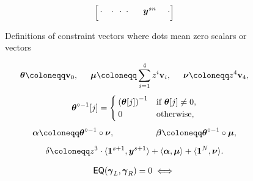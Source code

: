\begin{figure}[h!]
\begin{align*}
\begin{bmatrix}
          \hspace{0.6mm} \cdot & 
          \hspace{0.1mm} \cdot & 
          \hspace{-1mm} \cdot & 
          \hspace{-1.8mm} \cdot &
          \hspace{2.6mm} {\boldsymbol{y}}^{sn} & 
          \hspace{1.2mm} \cdot \\[3pt]
      \end{bmatrix}
  \end{align*}
  \caption{Definitions of constraint vectors where dots mean zero scalars or vectors}
  \label{fig:conVec1}
\end{figure}

\begin{flushleft}
  \begin{minipage}{.48\textwidth}
    \centering
      \begin{gather*}
        \vecnb{\theta} \coloneqq \textbf{v}_{0}, \hspace{0.5cm}
        \vecnb{\mu} \coloneqq \sum_{i=1}^{4} z^{i} \textbf{v}_i, \hspace{0.5cm}
        \vecnb{\nu} \coloneqq z^4 \textbf{v}_4,\\[4pt]
        \vecnb{\theta}^{\circ -1}[j] = 
        \begin{cases}
          \left(\vecnb{\theta}[j]\right)^{-1} & \text{if } \vecnb{\theta}[j] \neq 0, \\
          0 & \text{otherwise,}
        \end{cases} \\[4pt]
        \vecnb{\alpha} \coloneqq \vecnb{\theta}^{\circ -1} \circ \vecnb{\nu}, \hspace{1.7cm}
        \vecnb{\beta} \coloneqq \vecnb{\theta}^{\circ -1} \circ \vecnb{\mu},\\[5pt]
        \delta \coloneqq z^3 \cdot \langle \vecnb{1}^{s+1}, \vecnb{y}^{s+1} \rangle + \langle \vecnb{\alpha}, \vecnb{\mu}\rangle + \langle \vecnb{1}^N, \vecnb{\nu}\rangle.
      \end{gather*}
    \label{fig:conVec2}
  \end{minipage}%
  \hfill
  \begin{minipage}{0.48\textwidth}
    \centering
      \begin{align}
        &
        \textsf{EQ}(\vecnb{\gamma}_L, \vecnb{\gamma}_R) = 0 \iff \nonumber\\

\end{align}
\end{minipage}
\end{flushleft}
